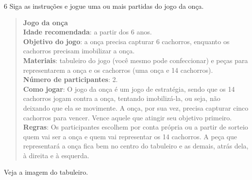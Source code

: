 

\num{6} Siga as instruções e jogue uma ou mais partidas do jogo da onça.

\begin{quote}
\textbf{Jogo da onça}\\
\textbf{Idade recomendada}: a partir dos 6 anos.\\
\textbf{Objetivo do jogo}: a onça precisa capturar 6 cachorros, enquanto
os cachorros precisam imobilizar a onça.\\
\textbf{Materiais}: tabuleiro do jogo (você mesmo pode confeccionar) e
peças para representarem a onça e os cachorros (uma onça e 14
cachorros).\\
\textbf{Número de participantes}: 2.\\
\textbf{Como jogar}: O jogo da onça é um jogo de estratégia, sendo que
os 14 cachorros jogam contra a onça, tentando imobilizá-la, ou seja, não
deixando que ela se movimente. A onça, por sua vez, precisa capturar
cinco cachorros para vencer. Vence aquele que atingir seu objetivo
primeiro.\\
\textbf{Regras}: Os participantes escolhem por conta própria ou a partir
de sorteio quem vai ser a onça e quem vai representar os 14 cachorros. A
peça que representará a onça fica bem no centro do tabuleiro e as
demais, atrás dela, à direita e à esquerda.
\end{quote}

Veja a imagem do tabuleiro.


